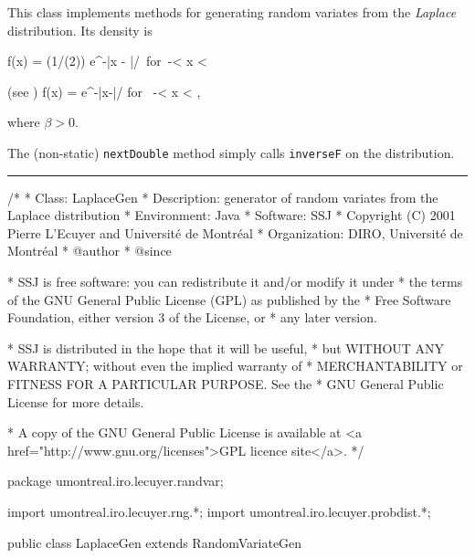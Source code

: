 
This class implements methods for generating random variates from the 
{\em Laplace\/} distribution. Its density is
\begin{htmlonly}
\eq
  f(x) = (1/(2\beta)) e^{-|x - \mu|/\beta}\mbox{ for }-\infty < x < \infty
\endeq
\end{htmlonly}
\begin{latexonly}
(see \cite[page 165]{tJOH95b})
\eq
    f(x) = e^{-|x-\mu|/\beta}
    \qquad \mbox {for } -\infty < x < \infty,           
\endeq
\end{latexonly}
where $\beta > 0$.

The (non-static) \texttt{nextDouble} method simply calls \texttt{inverseF} on the
distribution. 

\bigskip\hrule


\begin{code}
\begin{hide}
/*
 * Class:        LaplaceGen
 * Description:  generator of random variates from the Laplace distribution
 * Environment:  Java
 * Software:     SSJ 
 * Copyright (C) 2001  Pierre L'Ecuyer and Université de Montréal
 * Organization: DIRO, Université de Montréal
 * @author       
 * @since

 * SSJ is free software: you can redistribute it and/or modify it under
 * the terms of the GNU General Public License (GPL) as published by the
 * Free Software Foundation, either version 3 of the License, or
 * any later version.

 * SSJ is distributed in the hope that it will be useful,
 * but WITHOUT ANY WARRANTY; without even the implied warranty of
 * MERCHANTABILITY or FITNESS FOR A PARTICULAR PURPOSE.  See the
 * GNU General Public License for more details.

 * A copy of the GNU General Public License is available at
   <a href="http://www.gnu.org/licenses">GPL licence site</a>.
 */
\end{hide}
package umontreal.iro.lecuyer.randvar;\begin{hide}
import umontreal.iro.lecuyer.rng.*;
import umontreal.iro.lecuyer.probdist.*;
\end{hide}

public class LaplaceGen extends RandomVariateGen \begin{hide} {
   private double mu;
   private double beta;
\end{hide}\end{code}


